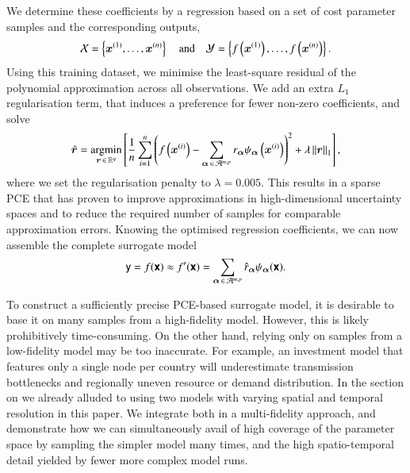We determine these coefficients by a regression based on a set of cost parameter
samples and the corresponding outputs,
\begin{equation}
    \mathcal{X} = \left\{ \bm x^{(1)},\dots,\bm x^{(n)} \right\} \quad\text{and}\quad
    \mathcal{Y} = \left\{ f\left(\bm x^{(1)}\right),\dots,f\left(\bm x^{(n)}\right) \right\}.
\end{equation}
Using this training dataset, we minimise the least-square residual of the
polynomial approximation across all observations. We add an extra $L_1$
regularisation term, %
that induces a preference for fewer non-zero coefficients, and solve
\begin{equation}
    \hat{\bm{r}} = \operatorname*{\arg\!\min}_{\bm{r} \,\in\, \mathbb{R}^q} \left[ \frac{1}{n} \sum_{i=1}^n \left(
        f\left(\bm x^{(i)}\right) - \sum_{{\bm{\alpha}} \,\in\, \mathcal{A}^{m,p}} r_{\bm{\alpha}} \psi_{\bm{\alpha}}\left(\bm x^{(i)}\right)
        \right)^2  + \lambda \left\lVert\bm{r}\right\rVert_1 \right],
        \label{eq:regression}
    \end{equation}
where we set the regularisation penalty to $\lambda=0.005$. This results in a
sparse PCE that has proven to improve approximations in high-dimensional
uncertainty spaces and to reduce the required number of samples for comparable
approximation errors.\cite{gratiet_metamodel-based_2015} Knowing the optimised
regression coefficients, we can now assemble the complete surrogate model
\begin{equation}
    \mathsf{y} = f(\boldsymbol{\mathsf{x}}) \approx f'(\boldsymbol{\mathsf{x}}) = \sum_{{\bm{\alpha}} \,\in\, \mathcal{A}^{m,p}} \hat{r}_{\bm{\alpha}} \psi_{\bm{\alpha}} (\boldsymbol{\mathsf{x}}).
\end{equation}



To construct a sufficiently precise PCE-based surrogate model, it is desirable
to base it on many samples from a high-fidelity model. However, this is likely
prohibitively time-consuming. On the other hand, relying only on samples from a
low-fidelity model may be too inaccurate.\cite{ng_multifidelity_2012} For
example, an investment model that features only a single node per country will
underestimate transmission bottlenecks and regionally uneven resource or demand
distribution. In the section on  we already alluded to using
two models with varying spatial and temporal resolution in this paper. We
integrate both in a multi-fidelity
approach,\cite{ng_multifidelity_2012,palar_multi-fidelity_2016} and demonstrate
how we can simultaneously avail of high coverage of the parameter space by
sampling the simpler model many times, and the high spatio-temporal detail
yielded by fewer more complex model runs.

